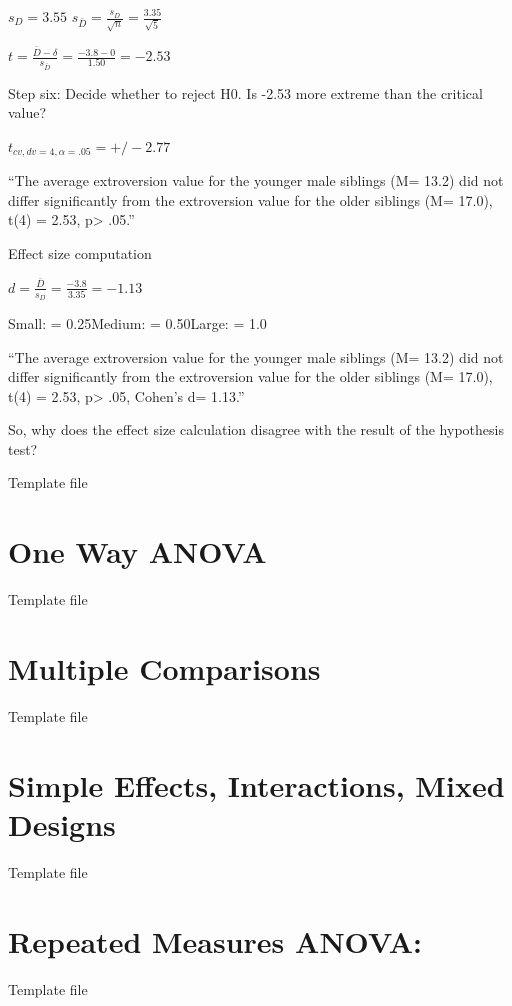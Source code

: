 \documentclass[]{book}
\theoremstyle{definition}
\theoremstyle{definition}
\theoremstyle{definition}
\theoremstyle{remark}
\begin{document}
{\(s_D=3.55\) \(s_\bar{D} =\frac{s_D}{\sqrt{n}}= \frac{3.35}{\sqrt{5}}\)

\(t = \frac{\bar{D}-\delta}{s_\bar{D}} = \frac{-3.8-0}{1.50}= -2.53\)

Step six: Decide whether to reject H0. Is -2.53 more extreme than the
critical value?

\(t_{cv,dv=4, \alpha=.05}= +/- 2.77\)

``The average extroversion value for the younger male siblings (M= 13.2)
did not differ significantly from the extroversion value for the older
siblings (M= 17.0), t(4) = 2.53, p\textgreater{} .05.''

Effect size computation

\(d = \frac{\bar{D}}{s_D}= \frac{-3.8}{3.35} = -1.13\)

Small: = 0.25Medium: = 0.50Large: = 1.0

``The average extroversion value for the younger male siblings (M= 13.2)
did not differ significantly from the extroversion value for the older
siblings (M= 17.0), t(4) = 2.53, p\textgreater{} .05, Cohen's d= 1.13.''

So, why does the effect size calculation disagree with the result of the
hypothesis test?

Template file

\chapter{One Way ANOVA}\label{one-way-anova}

Template file

\chapter{Multiple Comparisons}\label{multiple-comparisons}

Template file

\chapter{Simple Effects, Interactions, Mixed
Designs}\label{simple-effects-interactions-mixed-designs}

Template file

\chapter{Repeated Measures ANOVA:}\label{repeated-measures-anova}

Template file

}
\end{document}
